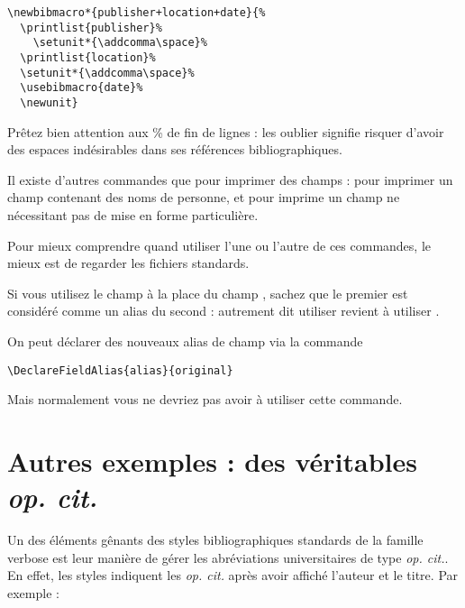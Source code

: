 \begin{verbatim}
\newbibmacro*{publisher+location+date}{%
  \printlist{publisher}%
    \setunit*{\addcomma\space}%
  \printlist{location}%
  \setunit*{\addcomma\space}%
  \usebibmacro{date}%
  \newunit}
\end{verbatim}



Prêtez bien attention aux \% de fin de lignes : les oublier signifie risquer d'avoir des espaces indésirables dans ses références bibliographiques.


\begin{anedocte}

Il  existe d'autres commandes que  pour imprimer des champs :  pour imprimer un champ contenant des noms de personne, et  pour imprime un champ ne nécessitant pas de mise en forme particulière.

Pour mieux comprendre quand utiliser l'une ou l'autre de ces commandes, le mieux est de regarder les fichiers standards.

\end{anedocte}
\begin{anedocte}
Si vous utilisez le champ  à la place du champ , sachez que le premier est considéré comme un alias du second : autrement dit utiliser  revient à utiliser .

On peut déclarer des nouveaux alias de champ via la commande 

\begin{verbatim}
\DeclareFieldAlias{alias}{original}
\end{verbatim}

Mais normalement vous ne devriez pas avoir à utiliser cette commande.
\end{anedocte}

\section{Autres exemples : des véritables \emph{op. cit.}}

Un des éléments gênants des styles bibliographiques standards de la famille verbose est leur manière de gérer les abréviations universitaires de type \emph{op. cit.}. En effet, les styles indiquent les \emph{op. cit.} après avoir affiché l'auteur et le titre. Par exemple :

